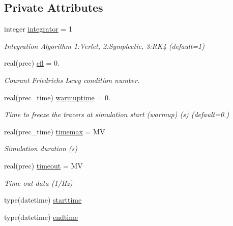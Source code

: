 \subsection*{Private Attributes}
\begin{DoxyCompactItemize}
\item 
integer \mbox{\hyperlink{structsimulation__globals__mod_1_1parameters__t_a4e57d5a1897acaf67eb14e39e3e0cf21}{integrator}} = 1
\begin{DoxyCompactList}\small\item\em Integration Algorithm 1\+:Verlet, 2\+:Symplectic, 3\+:R\+K4 (default=1) \end{DoxyCompactList}\item 
real(prec) \mbox{\hyperlink{structsimulation__globals__mod_1_1parameters__t_a63d8108183b786ec9acf16af2164bda1}{cfl}} = 0.
\begin{DoxyCompactList}\small\item\em Courant Friedrichs Lewy condition number. \end{DoxyCompactList}\item 
real(prec\+\_\+time) \mbox{\hyperlink{structsimulation__globals__mod_1_1parameters__t_aff3f4d5714c5a91daaad20aacf63f0a5}{warmuptime}} = 0.
\begin{DoxyCompactList}\small\item\em Time to freeze the tracers at simulation start (warmup) (s) (default=0.) \end{DoxyCompactList}\item 
real(prec\+\_\+time) \mbox{\hyperlink{structsimulation__globals__mod_1_1parameters__t_ad56e8a5217faee90d48d0811a36cce32}{timemax}} = MV
\begin{DoxyCompactList}\small\item\em Simulation duration (s) \end{DoxyCompactList}\item 
real(prec) \mbox{\hyperlink{structsimulation__globals__mod_1_1parameters__t_af4190961e6191cf07a9b04b0b864ec95}{timeout}} = MV
\begin{DoxyCompactList}\small\item\em Time out data (1/\+Hz) \end{DoxyCompactList}\item 
type(datetime) \mbox{\hyperlink{structsimulation__globals__mod_1_1parameters__t_a8e3abdcb1022685a07ca65c3c6a50203}{starttime}}
\item 
type(datetime) \mbox{\hyperlink{structsimulation__globals__mod_1_1parameters__t_a79f52ac6e24e87eba3c809d97d647aaf}{endtime}}
\end{DoxyCompactItemize}


